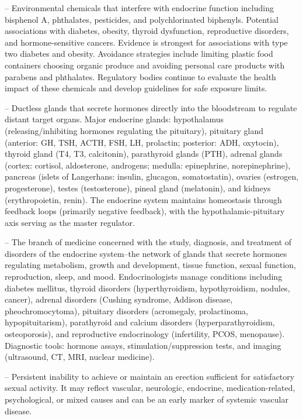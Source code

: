 -- Environmental chemicals that interfere with endocrine function including bisphenol A, phthalates, pesticides, and polychlorinated biphenyls. Potential associations with diabetes, obesity, thyroid dysfunction, reproductive disorders, and hormone-sensitive cancers. Evidence is strongest for associations with type two diabetes and obesity. Avoidance strategies include limiting plastic food containers choosing organic produce and avoiding personal care products with parabens and phthalates. Regulatory bodies continue to evaluate the health impact of these chemicals and develop guidelines for safe exposure limits.

-- Ductless glands that secrete hormones directly into the bloodstream to regulate distant target organs. Major endocrine glands: hypothalamus (releasing/inhibiting hormones regulating the pituitary), pituitary gland (anterior: GH, TSH, ACTH, FSH, LH, prolactin; posterior: ADH, oxytocin), thyroid gland (T4, T3, calcitonin), parathyroid glands (PTH), adrenal glands (cortex: cortisol, aldosterone, androgens; medulla: epinephrine, norepinephrine), pancreas (islets of Langerhans: insulin, glucagon, somatostatin), ovaries (estrogen, progesterone), testes (testosterone), pineal gland (melatonin), and kidneys (erythropoietin, renin). The endocrine system maintains homeostasis through feedback loops (primarily negative feedback), with the hypothalamic-pituitary axis serving as the master regulator.

-- The branch of medicine concerned with the study, diagnosis, and treatment of disorders of the endocrine system--the network of glands that secrete hormones regulating metabolism, growth and development, tissue function, sexual function, reproduction, sleep, and mood. Endocrinologists manage conditions including diabetes mellitus, thyroid disorders (hyperthyroidism, hypothyroidism, nodules, cancer), adrenal disorders (Cushing syndrome, Addison disease, pheochromocytoma), pituitary disorders (acromegaly, prolactinoma, hypopituitarism), parathyroid and calcium disorders (hyperparathyroidism, osteoporosis), and reproductive endocrinology (infertility, PCOS, menopause). Diagnostic tools: hormone assays, stimulation/suppression tests, and imaging (ultrasound, CT, MRI, nuclear medicine).

-- Persistent inability to achieve or maintain an erection sufficient for satisfactory sexual activity. It may reflect vascular, neurologic, endocrine, medication-related, psychological, or mixed causes and can be an early marker of systemic vascular disease.

